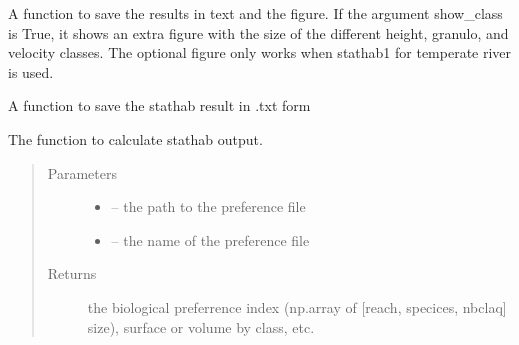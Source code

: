 \documentclass[letterpaper,10pt,english]{sphinxmanual}
\begin{document}
\begin{fulllineitems}
\begin{fulllineitems}
\begin{quote}
\begin{description}
\end{description}\end{quote}

\end{fulllineitems}


\begin{fulllineitems}
\label{\detokenize{index:src.stathab_c.Stathab.savefig_stahab}}
A function to save the results in text and the figure. If the argument show\_class is True,
it shows an extra figure with the size of the different height, granulo, and velocity classes. The optional
figure only works when stathab1 for temperate river is used.

\end{fulllineitems}


\begin{fulllineitems}
\label{\detokenize{index:src.stathab_c.Stathab.savetxt_stathab}}
A function to save the stathab result in .txt form

\end{fulllineitems}


\begin{fulllineitems}
\label{\detokenize{index:src.stathab_c.Stathab.stathab_calc}}
The function to calculate stathab output.
\begin{quote}\begin{description}
\item[{Parameters}] \leavevmode\begin{itemize}
\item {} 
 -- the path to the preference file

\item {} 
 -- the name of the preference file

\end{itemize}

\item[{Returns}] \leavevmode
the biological preferrence index (np.array of {[}reach, specices, nbclaq{]} size), surface or volume by class, etc.


\end{description}
\end{quote}
\end{fulllineitems}
\end{fulllineitems}
\end{document}

